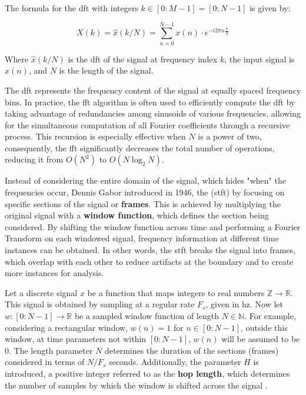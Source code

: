 The formula for the \gls{dft} with integers $k \in[0:M-1]=[0:N-1]$ is given by:

\begin{equation}
    \label{eq:frmwk_audio_fund_dft}
    X(k) = \hat{x}(k / N)=\sum_{n=0}^{N-1} x(n) \cdot e^{-i 2 \pi n \frac{k}{N} }
\end{equation}

Where $\hat{x}(k/N)$ is the \gls{dft} of the signal at frequency index $k$, the input signal is $x(n)$, and $N$ is the length of the signal.

The \gls{dft} represents the frequency content of the signal at equally spaced frequency bins. In practice, the \gls{fft} algorithm is often used to efficiently compute the \gls{dft} by taking advantage of redundancies among sinusoids of various frequencies, allowing for the simultaneous computation of all Fourier coefficients through a recursive process. This recursion is especially effective when $N$ is a power of two, consequently, the \gls{fft} significantly decreases the total number of operations, reducing it from $O(N^2)$ to $O(N \log_2 N)$.

Instead of considering the entire domain of the signal, which hides "when" the frequencies occur, Dennis Gabor introduced in 1946, the  (\gls{stft}) by focusing on specific sections of the signal or \textbf{frames}. This is achieved by multiplying the original signal with a \textbf{window function}, which defines the section being considered. By shifting the window function across time and performing a Fourier Transform on each windowed signal, frequency information at different time instances can be obtained. In other words, the \gls{stft} breaks the signal into frames, which overlap with each other to reduce artifacts at the boundary and to create more instances for analysis. 

Let a discrete signal $x$ be a function that maps integers to real numbers $\mathbb{Z} \rightarrow \mathbb{R}$. This signal is obtained by sampling at a regular rate $F_s$, given in \gls{hz}. Now let $w : [0:N - 1] \rightarrow \mathbb{R}$ be a sampled window function of length $N \in \mathbb{N}$. For example, considering a rectangular window, $w(n) = 1$ for $n \in [0:N - 1]$, outside this window, at time parameters not within $[0:N - 1]$, $w(n)$ will be assumed to be 0. The length parameter $N$ determines the duration of the sections (frames) considered in terms of $N/F_s$ seconds. Additionally, the parameter $H$ is introduced, a positive integer referred to as the \textbf{hop length}, which determines the number of samples by which the window is shifted across the signal \cite{Mueller2021}.

